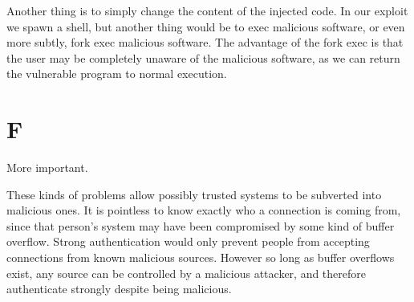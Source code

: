 \documentclass{article}
\begin{document}
Another thing is to simply change the content of the injected code.
In our exploit we spawn a shell, but another thing would be to exec malicious software, or even more subtly, fork exec malicious software.
The advantage of the fork exec is that the user may be completely unaware of the malicious software, as we can return the vulnerable program to normal execution.

\section*{F}

More important.

These kinds of problems allow possibly trusted systems to be subverted into malicious ones.
It is pointless to know exactly who a connection is coming from, since that person's system may have been compromised by some kind of buffer overflow.
Strong authentication would only prevent people from accepting connections from known malicious sources.
However so long as buffer overflows exist, any source can be controlled by a malicious attacker, and therefore authenticate strongly despite being malicious.
\end{document}
